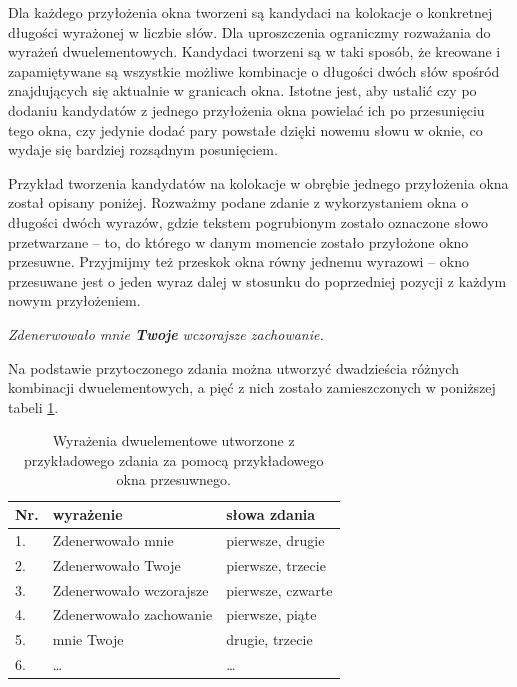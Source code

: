 \par
Dla każdego przyłożenia okna tworzeni są kandydaci na kolokacje o konkretnej długości wyrażonej w liczbie słów.
Dla uproszczenia ograniczmy rozważania do wyrażeń dwuelementowych.
Kandydaci tworzeni są w taki sposób, że kreowane i zapamiętywane są wszystkie możliwe kombinacje o długości dwóch słów spośród znajdujących się aktualnie w granicach okna.
Istotne jest, aby ustalić czy po dodaniu kandydatów z jednego przyłożenia okna powielać ich po przesunięciu tego okna, czy jedynie dodać pary powstałe dzięki nowemu słowu w oknie, co wydaje się bardziej rozsądnym posunięciem.

\par
Przykład tworzenia kandydatów na kolokacje w obrębie jednego przyłożenia okna został opisany poniżej.
Rozważmy podane zdanie z wykorzystaniem okna o długości dwóch wyrazów, gdzie tekstem pogrubionym zostało oznaczone słowo przetwarzane -- to, do którego w danym momencie zostało przyłożone okno przesuwne.
Przyjmijmy też przeskok okna równy jednemu wyrazowi -- okno przesuwane jest o jeden wyraz dalej w stosunku do poprzedniej pozycji z każdym nowym przyłożeniem.
\begin{center}
\textit{Zdenerwowało mnie \textbf{Twoje} wczorajsze zachowanie.}
\end{center}
Na podstawie przytoczonego zdania można utworzyć dwadzieścia różnych kombinacji dwuelementowych, a pięć z nich zostało zamieszczonych w poniższej tabeli \ref{sliding_window_example}.

\begin{table}[h!]
\centering
\begin{tabular}{l l l}
	\toprule
	Nr.	& wyrażenie 				& słowa zdania		\\
	\midrule
	1. 	& Zdenerwowało mnie			& pierwsze, drugie	\\
	2. 	& Zdenerwowało Twoje 		& pierwsze, trzecie	\\
	3. 	& Zdenerwowało wczorajsze 	& pierwsze, czwarte	\\
	4. 	& Zdenerwowało zachowanie 	& pierwsze, piąte	\\
	5. 	& mnie Twoje 				& drugie, trzecie	\\
	6.	& \ldots					& \ldots			\\
	\bottomrule
\end{tabular}
\caption[Przykład wykorzystania okna przesuwnego]{Wyrażenia dwuelementowe utworzone z przykładowego zdania za pomocą przykładowego okna przesuwnego.}
\label{sliding_window_example}
\end{table}

